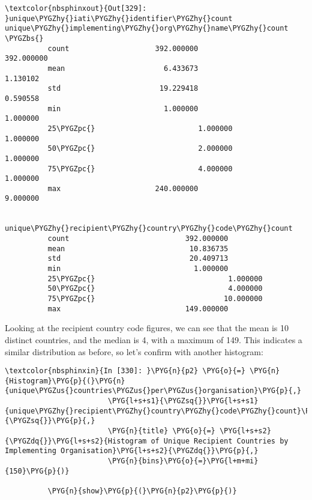 \documentclass[letterpaper,10pt,english]{sphinxmanual}
\begin{document}
\begin{Verbatim}[commandchars=\\\{\}]
\textcolor{nbsphinxout}{Out[329]: }unique\PYGZhy{}iati\PYGZhy{}identifier\PYGZhy{}count  unique\PYGZhy{}implementing\PYGZhy{}org\PYGZhy{}name\PYGZhy{}count  \PYGZbs{}
          count                    392.000000                          392.000000
          mean                       6.433673                            1.130102
          std                       19.229418                            0.590558
          min                        1.000000                            1.000000
          25\PYGZpc{}                        1.000000                            1.000000
          50\PYGZpc{}                        2.000000                            1.000000
          75\PYGZpc{}                        4.000000                            1.000000
          max                      240.000000                            9.000000
          
                 unique\PYGZhy{}recipient\PYGZhy{}country\PYGZhy{}code\PYGZhy{}count
          count                           392.000000
          mean                             10.836735
          std                              20.409713
          min                               1.000000
          25\PYGZpc{}                               1.000000
          50\PYGZpc{}                               4.000000
          75\PYGZpc{}                              10.000000
          max                             149.000000
\end{Verbatim}

Looking at the recipient country code figures, we can see that the mean
is 10 distinct countries, and the median is 4, with a maximum of 149.
This indicates a similar distribution as before, so let's confirm with
another histogram:

\begin{Verbatim}[commandchars=\\\{\}]
\textcolor{nbsphinxin}{In [330]: }\PYG{n}{p2} \PYG{o}{=} \PYG{n}{Histogram}\PYG{p}{(}\PYG{n}{unique\PYGZus{}countries\PYGZus{}per\PYGZus{}organisation}\PYG{p}{,}
                        \PYG{l+s+s1}{\PYGZsq{}}\PYG{l+s+s1}{unique\PYGZhy{}recipient\PYGZhy{}country\PYGZhy{}code\PYGZhy{}count}\PYG{l+s+s1}{\PYGZsq{}}\PYG{p}{,}
                        \PYG{n}{title} \PYG{o}{=} \PYG{l+s+s2}{\PYGZdq{}}\PYG{l+s+s2}{Histogram of Unique Recipient Countries by Implementing Organisation}\PYG{l+s+s2}{\PYGZdq{}}\PYG{p}{,}
                        \PYG{n}{bins}\PYG{o}{=}\PYG{l+m+mi}{150}\PYG{p}{)}
          
          \PYG{n}{show}\PYG{p}{(}\PYG{n}{p2}\PYG{p}{)}
\end{Verbatim}
\end{document}
